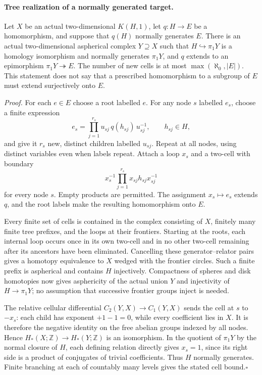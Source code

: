 \paragraph{Tree realization of a normally generated target.}
Let $X$ be an actual two-dimensional $K(H,1)$, let $q:H\to E$ be a
homomorphism, and suppose that $q(H)$ normally generates $E$. There is an
actual two-dimensional aspherical complex $Y\supseteq X$ such that
$H\hookrightarrow\pi_1Y$ is a homology isomorphism and normally generates
$\pi_1Y$, and $q$ extends to an epimorphism $\pi_1Y\twoheadrightarrow E$.
The number of new cells is at most $\max(\aleph_0,|E|)$. This statement
does not say that a prescribed homomorphism to a subgroup of $E$ must
extend surjectively onto $E$.

\emph{Proof.}
For each $e\in E$ choose a root labelled $e$. For any node $s$ labelled
$e_s$, choose a finite expression
\[
 e_s=\prod_{j=1}^{r_s}u_{sj}\,q(h_{sj})\,u_{sj}^{-1},
 \qquad h_{sj}\in H,
\]
and give it $r_s$ new, distinct children labelled $u_{sj}$.
Repeat at all nodes, using distinct variables even when labels repeat.
Attach a loop $x_s$ and a two-cell with boundary
\[
             x_s^{-1}\prod_{j=1}^{r_s}
                    x_{sj}h_{sj}x_{sj}^{-1}
\]
for every node $s$. Empty products are permitted.
The assignment $x_s\mapsto e_s$ extends $q$, and the root labels make
the resulting homomorphism onto $E$.

Every finite set of cells is contained in the complex consisting of
$X$, finitely many finite tree prefixes, and the loops at their
frontiers. Starting at the roots, each internal loop occurs once in
its own two-cell and in no other two-cell remaining after its ancestors
have been eliminated. Cancelling these generator--relator pairs
gives a homotopy equivalence to $X$ wedged with the frontier circles.
Such a finite prefix is aspherical and contains $H$ injectively.
Compactness of spheres and disk homotopies now gives asphericity of
the actual union $Y$ and injectivity of $H\to\pi_1Y$; no assumption
that successive frontier groups inject is needed.

The relative cellular differential $C_2(Y,X)\to C_1(Y,X)$ sends the
cell at $s$ to $-x_s$: each child has exponent $+1-1=0$, while every
coefficient lies in $X$. It is therefore the negative identity on
the free abelian groups indexed by all nodes. Hence
$H_*(X;\mathbb Z)\to H_*(Y;\mathbb Z)$ is an isomorphism. In the
quotient of $\pi_1Y$ by the normal closure of $H$, each defining
relation directly gives $x_s=1$, since its right side is a product
of conjugates of trivial coefficients. Thus $H$ normally generates.
Finite branching at each of countably many levels gives the stated
cell bound.\hfill$\square$

